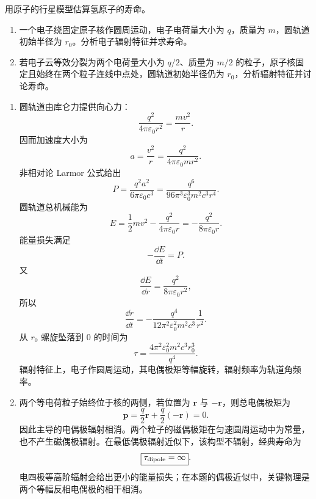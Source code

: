 \begin{question}[经典氢原子寿命]
用原子的行星模型估算氢原子的寿命。
\begin{enumerate}
  \item 一个电子绕固定原子核作圆周运动，电子电荷量大小为 $q$，质量为 $m$，圆轨道初始半径为 $r_0$。分析电子辐射特征并求寿命。
  \item 若电子云等效分裂为两个电荷量大小为 $q/2$、质量为 $m/2$ 的粒子，原子核固定且始终在两个粒子连线中点处，圆轨道初始半径仍为 $r_0$，分析辐射特征并讨论寿命。
\end{enumerate}
\begin{solution}
\begin{enumerate}
  \item 圆轨道由库仑力提供向心力：
  \[
    \frac{q^2}{4\pi\varepsilon_0r^2}=\frac{mv^2}{r} .
  \]
  因而加速度大小为
  \[
    a=\frac{v^2}{r}=\frac{q^2}{4\pi\varepsilon_0mr^2} .
  \]
  非相对论 Larmor 公式给出
  \[
    P=\frac{q^2a^2}{6\pi\varepsilon_0c^3}
    =\frac{q^6}{96\pi^3\varepsilon_0^3m^2c^3r^4} .
  \]
  圆轨道总机械能为
  \[
    E=\frac12mv^2-\frac{q^2}{4\pi\varepsilon_0r}
    =-\frac{q^2}{8\pi\varepsilon_0r} .
  \]
  能量损失满足
  \[
    -\frac{\dd{E}}{\dd{t}}=P .
  \]
  又
  \[
    \frac{\dd{E}}{\dd{r}}=\frac{q^2}{8\pi\varepsilon_0r^2},
  \]
  所以
  \[
    \frac{\dd{r}}{\dd{t}}
    =-\frac{q^4}{12\pi^2\varepsilon_0^2m^2c^3}\frac1{r^2} .
  \]
  从 $r_0$ 螺旋坠落到 $0$ 的时间为
  \[
    \boxed{\tau=\frac{4\pi^2\varepsilon_0^2m^2c^3r_0^3}{q^4}} .
  \]
  辐射特征上，电子作圆周运动，其电偶极矩等幅旋转，辐射频率为轨道角频率。

  \item 两个等电荷粒子始终位于核的两侧，若位置为 $\mathbf r$ 与 $-\mathbf r$，则总电偶极矩为
  \[
    \mathbf p=\frac{q}{2}\mathbf r+\frac{q}{2}(-\mathbf r)=0 .
  \]
  因此主导的电偶极辐射相消。两个粒子的磁偶极矩在匀速圆周运动中为常量，也不产生磁偶极辐射。在最低偶极辐射近似下，该构型不辐射，经典寿命为
  \[
    \boxed{\tau_{\rm dipole}=\infty} .
  \]
  电四极等高阶辐射会给出更小的能量损失；在本题的偶极近似中，关键物理是两个等幅反相电偶极的相干相消。
\end{enumerate}
\end{solution}
\end{question}
